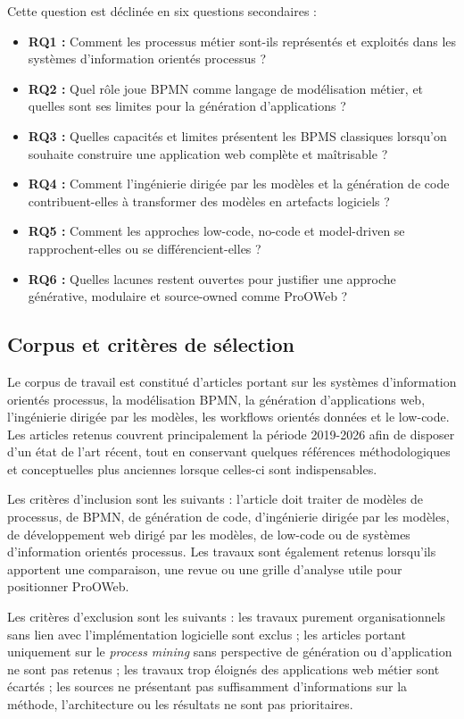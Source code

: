 \documentclass[12pt,a4paper]{article}
\begin{document}
Cette question est déclinée en six questions secondaires :

\begin{itemize}[leftmargin=*]
  \item \textbf{RQ1 :} Comment les processus métier sont-ils représentés et exploités dans les systèmes d'information orientés processus ?
  \item \textbf{RQ2 :} Quel rôle joue BPMN comme langage de modélisation métier, et quelles sont ses limites pour la génération d'applications ?
  \item \textbf{RQ3 :} Quelles capacités et limites présentent les BPMS classiques lorsqu'on souhaite construire une application web complète et maîtrisable ?
  \item \textbf{RQ4 :} Comment l'ingénierie dirigée par les modèles et la génération de code contribuent-elles à transformer des modèles en artefacts logiciels ?
  \item \textbf{RQ5 :} Comment les approches low-code, no-code et model-driven se rapprochent-elles ou se différencient-elles ?
  \item \textbf{RQ6 :} Quelles lacunes restent ouvertes pour justifier une approche générative, modulaire et source-owned comme ProOWeb ?
\end{itemize}

\subsection{Corpus et critères de sélection}

Le corpus de travail est constitué d'articles portant sur les systèmes d'information orientés processus, la modélisation BPMN, la génération d'applications web, l'ingénierie dirigée par les modèles, les workflows orientés données et le low-code. Les articles retenus couvrent principalement la période 2019-2026 afin de disposer d'un état de l'art récent, tout en conservant quelques références méthodologiques et conceptuelles plus anciennes lorsque celles-ci sont indispensables.

Les critères d'inclusion sont les suivants : l'article doit traiter de modèles de processus, de BPMN, de génération de code, d'ingénierie dirigée par les modèles, de développement web dirigé par les modèles, de low-code ou de systèmes d'information orientés processus. Les travaux sont également retenus lorsqu'ils apportent une comparaison, une revue ou une grille d'analyse utile pour positionner ProOWeb.

Les critères d'exclusion sont les suivants : les travaux purement organisationnels sans lien avec l'implémentation logicielle sont exclus ; les articles portant uniquement sur le \textit{process mining} sans perspective de génération ou d'application ne sont pas retenus ; les travaux trop éloignés des applications web métier sont écartés ; les sources ne présentant pas suffisamment d'informations sur la méthode, l'architecture ou les résultats ne sont pas prioritaires.
\end{document}
